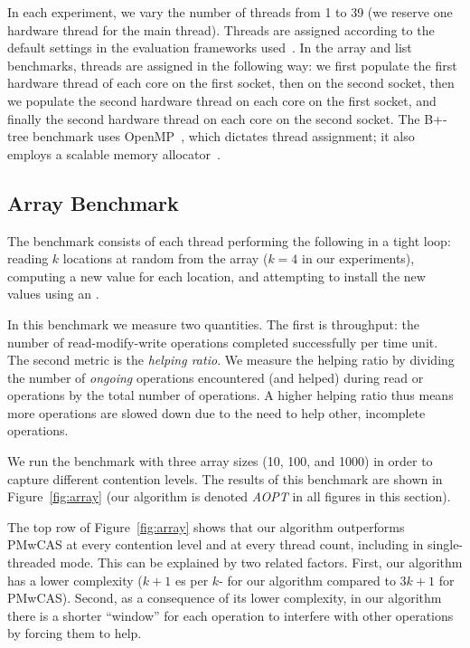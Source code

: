 In each experiment, we vary the number of threads from 1 to 39 (we reserve one hardware thread for the main thread). Threads are assigned according to the default settings in the evaluation frameworks used~\cite{bztreecode,pibencode,pmwcascode}. In the array and list benchmarks, threads are assigned in the following way: we first populate the first hardware thread of each core on the first socket, then on the second socket, then we populate the second hardware thread on each core on the first socket, and finally the second hardware thread on each core on the second socket. The B+-tree benchmark uses OpenMP~\cite{openmp}, which dictates thread assignment; it also employs a scalable memory allocator~\cite{AfekDM11}.

\subsection{Array Benchmark}

The benchmark consists of each thread performing the following in a tight loop: reading $k$ locations at random from the array ($k=4$ in our experiments), computing a new value for each location, and attempting to install the new values using an \mcas{}.

In this benchmark we measure two quantities. The first is throughput: the number of read-modify-write operations completed successfully per time unit. The second metric is the \textit{helping ratio}. We measure the helping ratio by dividing the number of \textit{ongoing} \mcas{} operations encountered (and helped) during read or \mcas{} operations by the total number of \mcas{} operations. A higher helping ratio thus means more operations are slowed down due to the need to help other, incomplete \mcas{} operations.



We run the benchmark with three array sizes (10, 100, and 1000) in order to capture different contention levels. The results of this benchmark are shown in Figure~\ref{fig:array} (our algorithm is denoted \textit{AOPT} in all figures in this section). 

The top row of Figure~\ref{fig:array} shows that our algorithm outperforms PMwCAS at every contention level and at every thread count, including in single-threaded mode. This can be explained by two related factors. First, our algorithm has a  lower \cas{} complexity ($k+1$ \cas{}es per $k$-\cas{} for our algorithm compared to $3k+1$ for PMwCAS). Second, as a consequence of its lower complexity, in our algorithm there is a shorter ``window'' for each \mcas{} operation to interfere with other operations by forcing them to help.


